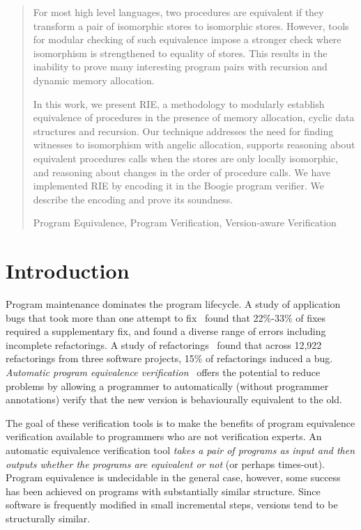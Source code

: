 \documentclass[runningheads,a4paper]{llncs}
\newcommand{\keywords}[1]{\par\addvspace\baselineskip
\noindent\keywordname\enspace\ignorespaces#1}
\begin{document}
\begin{abstract}
For most high level languages, two procedures are equivalent if they transform a pair of isomorphic stores to isomorphic stores. However, tools for modular checking of such equivalence impose a stronger check where isomorphism is strengthened to equality of stores. This results in the inability to prove many interesting program pairs with recursion and dynamic memory allocation.

In this work, we present RIE, a methodology to modularly establish equivalence of procedures in the presence of memory allocation, cyclic data structures and recursion. Our technique addresses the need for finding witnesses to isomorphism with angelic allocation, supports reasoning about equivalent procedures calls when the stores are only locally isomorphic, and reasoning about changes in the order of procedure calls. We have implemented RIE by encoding it in the Boogie program verifier. We describe the encoding and prove its soundness.

\keywords{Program Equivalence, Program Verification, Version-aware Verification}
\end{abstract}

\section{Introduction}

Program maintenance dominates the program lifecycle. A study of application bugs that took more than one attempt to fix~\cite{Park2012} found that 22\%-33\% of fixes required a supplementary fix, and found a diverse range of errors including incomplete refactorings. A study of refactorings~\cite{Bavota2012} found that across 12,922 refactorings from three software projects, 15\% of refactorings induced a bug. \emph{Automatic program equivalence verification}~\cite{Godlin09,Lahiri2012,Partush2014,Felsing2014} offers the potential to reduce problems by allowing a programmer to automatically (without programmer annotations) verify that the new version is behaviourally equivalent to the old.

The goal of these verification tools is to make the benefits of program equivalence verification available to programmers who are not verification experts. An automatic equivalence verification tool \emph{takes a pair of programs as input and then outputs whether the programs are equivalent or not} (or perhaps times-out). Program equivalence is undecidable in the general case, however, some success has been achieved on programs with substantially similar structure. Since software is frequently modified in small incremental steps, versions tend to be structurally similar.
\end{document}
